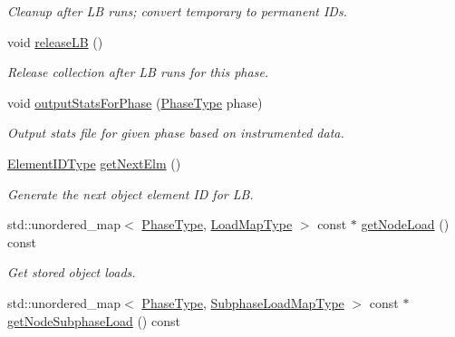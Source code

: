 \begin{DoxyCompactItemize}
\begin{DoxyCompactList}\small\item\em Cleanup after LB runs; convert temporary to permanent I\+Ds. \end{DoxyCompactList}\item 
void \hyperlink{structvt_1_1vrt_1_1collection_1_1balance_1_1_node_stats_a517e67b5ada69873ab40d5f6e007a818}{release\+LB} ()
\begin{DoxyCompactList}\small\item\em Release collection after LB runs for this phase. \end{DoxyCompactList}\item 
void \hyperlink{structvt_1_1vrt_1_1collection_1_1balance_1_1_node_stats_aa6e33fd5ae9275515557ada40ef3d489}{output\+Stats\+For\+Phase} (\hyperlink{namespacevt_a46ce6733d5cdbd735d561b7b4029f6d7}{Phase\+Type} phase)
\begin{DoxyCompactList}\small\item\em Output stats file for given phase based on instrumented data. \end{DoxyCompactList}\item 
\hyperlink{namespacevt_1_1vrt_1_1collection_1_1balance_a14c8d2c972f2913aa3f1636e5be0a120}{Element\+I\+D\+Type} \hyperlink{structvt_1_1vrt_1_1collection_1_1balance_1_1_node_stats_ac1b800713117d8f017746985a66dfbd2}{get\+Next\+Elm} ()
\begin{DoxyCompactList}\small\item\em Generate the next object element ID for LB. \end{DoxyCompactList}\item 
std\+::unordered\+\_\+map$<$ \hyperlink{namespacevt_a46ce6733d5cdbd735d561b7b4029f6d7}{Phase\+Type}, \hyperlink{namespacevt_1_1vrt_1_1collection_1_1balance_a45306ee4bf38fe3fb586d1ee2fa3d147}{Load\+Map\+Type} $>$ const  $\ast$ \hyperlink{structvt_1_1vrt_1_1collection_1_1balance_1_1_node_stats_a5b34d26f9e10f7ff3ceb92b95f0ed2f6}{get\+Node\+Load} () const
\begin{DoxyCompactList}\small\item\em Get stored object loads. \end{DoxyCompactList}\item 
std\+::unordered\+\_\+map$<$ \hyperlink{namespacevt_a46ce6733d5cdbd735d561b7b4029f6d7}{Phase\+Type}, \hyperlink{namespacevt_1_1vrt_1_1collection_1_1balance_a3d91523158c1025b7b665240072f3b7e}{Subphase\+Load\+Map\+Type} $>$ const  $\ast$ \hyperlink{structvt_1_1vrt_1_1collection_1_1balance_1_1_node_stats_a24660f52ff5e6a734a443ebbd1852519}{get\+Node\+Subphase\+Load} () const

\end{DoxyCompactItemize}
